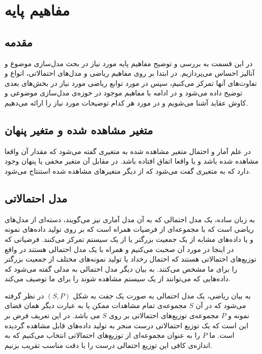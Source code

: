 \chapter{مفاهیم پایه}
\thispagestyle{empty}
\section{مقدمه}
در این قسمت به بررسی‌ و توضیح  مفاهیم پایه مورد نیاز در بحث مدل‌سازی موضوع
و آنالیز احساس
می‌‌پردازیم. در ابتدا بر روی مفاهیم ریاضی‌ و مدل‌های احتمالاتی،
   انواع و تفاوت‌های آنها تمرکز می‌‌کنیم، سپس در مورد توابع ریاضی مورد نیاز در بخش‌های بعدی توضیح داده می‌شود و در 
ادامه با مفاهیم موجود در حوزه‌ی مدل‌سازی موضوعی و کاوش عقاید
 آشنا می‌‌شویم و در مورد هر کدام توضیحات مورد نیاز را ارائه می‌‌دهیم. 

\section{متغیر مشاهده شده و متغیر پنهان }
در علم آمار
و احتمال متغیر مشاهده شده
به متغیری گفته می‌‌شود که مقدار آن واقعا مشاهده شده باشد و یا واقعا اتفاق افتاده باشد. در مقابل آن متغیر مخفی‌ یا پنهان
وجود دارد که به متغیری گفت می‌‌شود که از دیگر متغیر‌های مشاهده شده استنتاج
 می‌‌شود.

\section{مدل‌ احتمالاتی}
به زبان ساده، یک مدل احتمالی‌ که به آن مدل آماری
نیز می‌‌گویند، دسته‌ای‌ از مدل‌های ریاضی‌ است که با مجموعه‌ای از فرضیات  همراه است که بر روی تولید داده‌های نمونه
و یا داده‌های مشابه از یک جمعیت بزرگتر یا از یک سیستم تمرکز می‌‌کنند. فرضیاتی که در اینجا در مورد آن صحبت می‌‌کنیم و همراه با یک مدل احتمالی‌ هستند در واقع توزیع‌های احتمالاتی
هستند که احتمال رخداد یا تولید نمونه‌های مختلف از جمعیت بزرگتر را برای ما مشخص می‌‌کنند. به بیان دیگر مدل احتمالی‌ به مدلی‌ گفته می‌‌شود که داده‌هایی که می‌‌توانند از یک سیستم مشاهده شوند را برای ما توصیف می‌‌کند.

به بیان ریاضی‌، یک مدل احتمالی‌ به صورت یک جفت به شکل
$(S,P)$
در نظر گرفته می‌‌شود که در آن
$S$
مجموعه‌ی تمام مشاهدات ممکن یا به عبارت دیگر همان فضای نمونه
 و
$P$
مجموعه‌ی توزیع‌های احتمالاتی بر روی
$S$
می‌ باشد. در این تعریف فرض بر این است که یک توزیع احتمالاتی درست منجر به تولید داده‌های قابل مشاهده گردیده است. ما
$P$
را به عنوان مجموعه‌ای از توزیع‌های احتمالاتی انتخاب می‌‌کنیم که به اندازه‌ی کافی‌ این توزیع احتمالی‌ درست را با دقت مناسب تقریب بزنیم.

